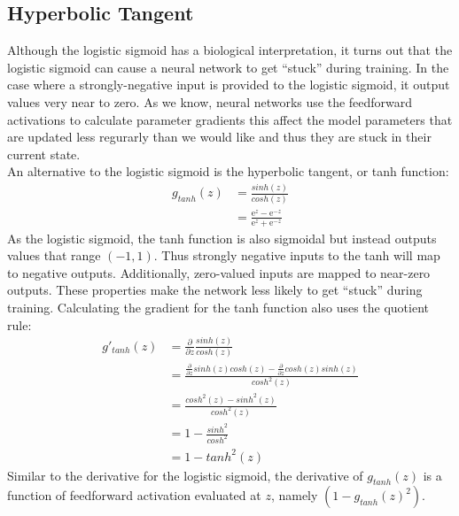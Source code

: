 \subsection{Hyperbolic Tangent}
Although the logistic sigmoid has a biological interpretation, it turns out that the logistic sigmoid can cause a neural network to get ``stuck'' during training. In the case where a strongly-negative input is provided to the logistic sigmoid, it output values very near to zero. As we know, neural networks use the feedforward activations to calculate parameter gradients this affect the model parameters that are updated less regurarly than we would like and thus they are stuck in their current state.\cite{Goodfellow-et-al-2016} \\
An alternative to the logistic sigmoid is the hyperbolic tangent, or tanh function:
\begin{equation}
\begin{split}
g_{tanh}(z) &= \frac{sinh(z)}{cosh(z)}\\
			&= \frac{\mathrm{e}^z-\mathrm{e}^{-z}}{\mathrm{e}^z + \mathrm{e}^{-z}}
\end{split}
\end{equation}
As the logistic sigmoid, the tanh function is also sigmoidal but instead outputs values that range $(-1,1)$. Thus strongly negative inputs to the tanh will map to negative outputs. Additionally, zero-valued inputs are mapped to near-zero outputs. These properties make the network less likely to get ``stuck'' during training. Calculating the gradient for the tanh function also uses the quotient rule:
\begin{equation}
\begin{split}
g'_{tanh}(z) &= \frac{\partial}{\partial z}\frac{sinh(z)}{cosh(z)}\\
					&= \frac{\frac{\partial}{\partial z}sinh(z)cosh(z)-\frac{\partial}{\partial z}cosh(z)sinh(z)}{{cosh}^2(z)}\\
					&= \frac{{cosh}^2(z)-{sinh}^2(z)}{{cosh}^2(z)}\\
					&= 1 - \frac{{sinh}^2}{{cosh}^2}\\
					&= 1 - {tanh}^2(z)
\end{split}
\end{equation}
Similar to the derivative for the logistic sigmoid, the derivative of $g_{tanh}(z)$ is a function of feedforward activation evaluated at $z$, namely $(1 - g_{tanh}(z)^2)$.
